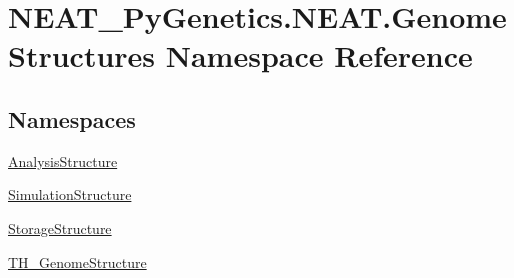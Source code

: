 \hypertarget{namespaceNEAT__PyGenetics_1_1NEAT_1_1GenomeStructures}{}\section{N\+E\+A\+T\+\_\+\+Py\+Genetics.\+N\+E\+A\+T.\+Genome\+Structures Namespace Reference}
\label{namespaceNEAT__PyGenetics_1_1NEAT_1_1GenomeStructures}
\subsection*{Namespaces}
\begin{DoxyCompactItemize}
\item 
 \hyperlink{namespaceNEAT__PyGenetics_1_1NEAT_1_1GenomeStructures_1_1AnalysisStructure}{Analysis\+Structure}
\item 
 \hyperlink{namespaceNEAT__PyGenetics_1_1NEAT_1_1GenomeStructures_1_1SimulationStructure}{Simulation\+Structure}
\item 
 \hyperlink{namespaceNEAT__PyGenetics_1_1NEAT_1_1GenomeStructures_1_1StorageStructure}{Storage\+Structure}
\item 
 \hyperlink{namespaceNEAT__PyGenetics_1_1NEAT_1_1GenomeStructures_1_1TH__GenomeStructure}{T\+H\+\_\+\+Genome\+Structure}
\end{DoxyCompactItemize}
